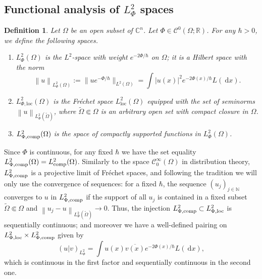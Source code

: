 \documentclass{article}
\newtheorem{defi}[theo]{Definition}
\newcommand{\loc}{\mathrm{loc}}
\newcommand{\abs}[1]{\left|#1\right|}
\newcommand{\norm}[1]{\left\|#1\right\|}
\newcommand{\lphi}{L^2_\Phi}
\newcommand{\DD}{\:\!\mathrm{d}}
\newcommand{\Cinf}{\mathscr{C}^\infty}
\newcommand{\NM}{\mathbb{N}}
\newcommand{\CM}{\mathbb{C}}
\newcommand{\h}{\hbar}
\newcommand{\pscal}[2]{\left(#1 | #2\right)}
\begin{document}
\subsection{Functional analysis of \texorpdfstring{$\lphi$}{Lphi}
  spaces}

\begin{defi}
  \label{defi:lphi}
  Let $ \Omega$ be an open subset of $ \CM^n$. Let
  $ \Phi \in \mathscr{C}^0( \Omega; \mathbb{R})$. For any $\h>0$, we
  define the following spaces.
  \begin{enumerate}%
  \item $L^2_\Phi(\Omega)$ is the $L^2$-space with weight
    $e^{-2\Phi/\h}$ on $\Omega$; it is a Hilbert space with the norm
    \[
    \norm{u}_{L^2_\Phi(\Omega)} := \|u e^{- \Phi/ \hbar}
    \|_{L^2(\Omega)} = \int \abs{u(x)}^2 e^{-2\Phi(x)/\h}L(\DD x).
    \]

  \item $L_{ \Phi,\loc}^{2}(\Omega)$ is the Fréchet space
    $L^2_\loc(\Omega)$ equipped with the set of seminorms
    $\norm{u}_{L^2_\Phi(\tilde\Omega)}$, where
    $\tilde\Omega\Subset\Omega$ is an arbitrary open set with compact
    closure in $\Omega$.

  \item $L^2_{\Phi,\textup{comp}}(\Omega)$ is the space of compactly
    supported functions in $L^2_\Phi(\Omega)$.
  \end{enumerate}
\end{defi}
Since $\Phi$ is continuous, for any fixed $\h$ we have the set
equality
$L^2_{\Phi,\textup{comp}}(\Omega)= L^2_{\textup{comp}}(\Omega)$.
Similarly to the space $\Cinf_0(\Omega)$ in distribution theory,
$L^2_{\Phi,\textup{comp}}$ is a projective limit of Fréchet spaces,
and following the tradition we will only use the convergence of
sequences: for a fixed $\h$, the sequence $(u_j)_{j\in\NM}$ converges
to $u$ in $L^2_{\Phi,\textup{comp}}$ if the support of all $u_j$ is
contained in a fixed subset $\tilde\Omega\Subset \Omega$ and
$\norm{u_j - u}_{\lphi(\tilde\Omega)}\to 0$. Thus, the injection
$L^2_{\Phi,\textup{comp}}\subset L^2_{ \Phi,\loc}$ is sequentially
continuous; and moreover we have a well-defined pairing on
$L_{ \Phi,\loc}^{2} \times L^2_{\Phi,\textup{comp}}$ given by
\[
\pscal{u}{v}_{\lphi} = \int u(x) \overline{v(x)} e^{-2\Phi(x)/\h}
L(\DD x),
\]
which is continuous in the first factor and sequentially continuous in
the second one.
\end{document}
